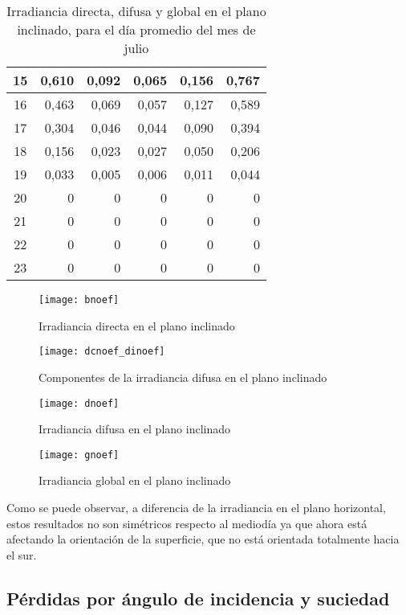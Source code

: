 \begin{table}[H]
\begin{tabular}{|c|r|r|r|r|r|}
15 & 0,610 & 0,092 & 0,065 & 0,156 & 0,767 \\ \hline
16 & 0,463 & 0,069 & 0,057 & 0,127 & 0,589 \\ \hline
17 & 0,304 & 0,046 & 0,044 & 0,090 & 0,394 \\ \hline
18 & 0,156 & 0,023 & 0,027 & 0,050 & 0,206 \\ \hline
19 & 0,033 & 0,005 & 0,006 & 0,011 & 0,044 \\ \hline
20 & 0     & 0     & 0     & 0     & 0     \\ \hline
21 & 0     & 0     & 0     & 0     & 0     \\ \hline
22 & 0     & 0     & 0     & 0     & 0     \\ \hline
23 & 0     & 0     & 0     & 0     & 0     \\ \hline
\end{tabular}
\caption{Irradiancia directa, difusa y global en el plano inclinado, para el día promedio del mes de julio \label{tab:hourly_tilted_values}}
\end{table}

\begin{figure}[H]
\texttt{[image: bnoef]}
\centering
\caption{Irradiancia directa  en el plano inclinado}
\label{fig:hourly_bef}
\end{figure}

\begin{figure}[H]
\texttt{[image: dcnoef\_dinoef]}
\centering
\caption{Componentes de la irradiancia difusa en el plano inclinado}
\label{fig:hourly_bef}
\end{figure}

\begin{figure}[H]
\texttt{[image: dnoef]}
\centering
\caption{Irradiancia difusa en el plano inclinado}
\label{fig:hourly_bef}
\end{figure}

\begin{figure}[H]
\texttt{[image: gnoef]}
\centering
\caption{Irradiancia global en el plano inclinado}
\label{fig:hourly_bef}
\end{figure}


Como se  puede observar, a diferencia de la irradiancia en el plano horizontal, estos resultados no son simétricos respecto al mediodía ya que ahora está afectando la orientación de la superficie, que no está orientada totalmente hacia el sur.

\subsection{Pérdidas por ángulo de incidencia y suciedad}

